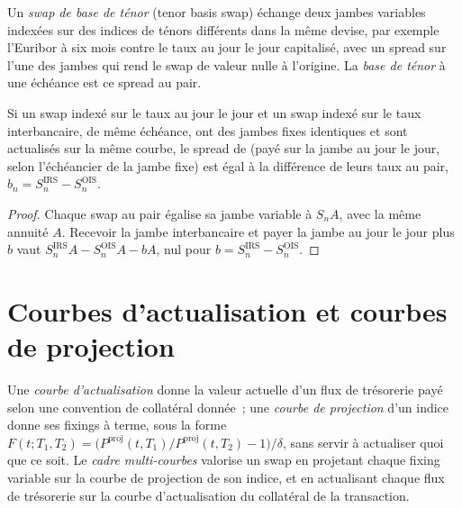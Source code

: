\begin{definition}\label{def:rc:multi-curve-and-collateral-discounting:basis}
Un \emph{swap de base de ténor} (tenor basis swap) échange deux jambes variables
indexées sur des indices de ténors différents dans la même devise, par exemple l'Euribor à six mois
contre le taux au jour le jour capitalisé, avec un spread sur l'une des jambes qui rend le swap
de valeur nulle à l'origine. La \emph{base de ténor} à une échéance
est ce spread au pair.
\end{definition}

\begin{proposition}\label{prop:rc:multi-curve-and-collateral-discounting:basisrates}
Si un swap indexé sur le taux au jour le jour et un swap indexé sur le taux interbancaire, de même
échéance, ont des jambes fixes identiques et sont actualisés sur la même courbe, le spread de  (payé sur la jambe au jour le jour, selon l'échéancier de la jambe fixe) est égal à
la différence de leurs taux au pair, $b_n = S^{\text{IRS}}_n - S^{\text{OIS}}_n$.
\end{proposition}
\begin{proof}
Chaque swap au pair égalise sa jambe variable à $S_n A$, avec la même annuité $A$.
Recevoir la jambe interbancaire et payer la jambe au jour le jour plus $b$ vaut
$S^{\text{IRS}}_nA - S^{\text{OIS}}_nA - bA$, nul pour $b=S^{\text{IRS}}_n-S^{\text{OIS}}_n$.
\end{proof}

\section{Courbes d'actualisation et courbes de projection}

\begin{definition}\label{def:rc:multi-curve-and-collateral-discounting:curves}
Une \emph{courbe d'actualisation} donne la valeur actuelle d'un
flux de trésorerie payé selon une convention de collatéral donnée~; une \emph{courbe de
projection} d'un indice donne ses fixings à terme, sous la forme
$F(t;T_1,T_2) = \bigl(P^{\text{proj}}(t,T_1)/P^{\text{proj}}(t,T_2)-1\bigr)/\delta$,
sans servir à actualiser quoi que ce soit. Le \emph{cadre
multi-courbes} valorise un swap en projetant chaque fixing variable
sur la courbe de projection de son indice, et en actualisant chaque flux de trésorerie sur la
courbe d'actualisation du collatéral de la transaction.
\end{definition}

